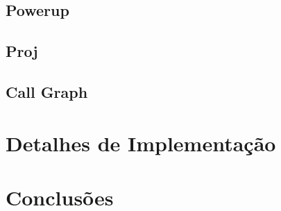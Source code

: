 \documentclass{report}
\begin{document}
\section{Powerup}

\section{Proj}

\section{Call Graph}

\chapter{Detalhes de Implementação}

\chapter{Conclusões}
\end{document}
